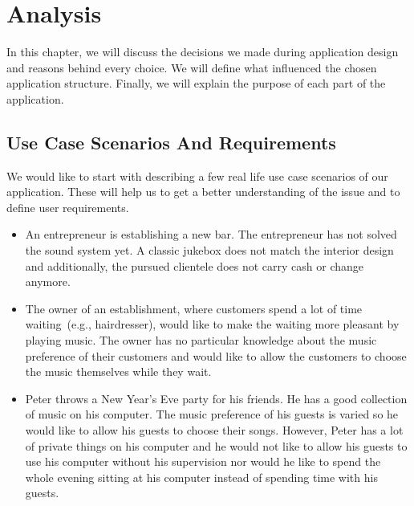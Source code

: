 \chapter{Analysis}

In this chapter, we will discuss the decisions we made during application design and reasons behind every choice. We will define what influenced the chosen application structure. Finally, we will explain the purpose of each part of the application.

\section{Use Case Scenarios And Requirements}

We would like to start with describing a few real life use case scenarios of our application. These will help us to get a better understanding of the issue and to define user requirements.
\begin{itemize}
    \item An entrepreneur is establishing a new bar. The entrepreneur has not solved the sound system yet. A classic jukebox does not match the interior design and additionally, the pursued clientele does not carry cash or change anymore.
    \item The owner of an establishment, where customers spend a lot of time waiting~(e.g., hairdresser), would like to make the waiting more pleasant by playing music. The owner has no particular knowledge about the music preference of their customers and would like to allow the customers to choose the music themselves while they wait.
    \item Peter throws a New Year's Eve party for his friends. He has a good collection of music on his computer. The music preference of his guests is varied so he would like to allow his guests to choose their songs. However, Peter has a lot of private things on his computer and he would not like to allow his guests to use his computer without his supervision nor would he like to spend the whole evening sitting at his computer instead of spending time with his guests.
\end{itemize}

